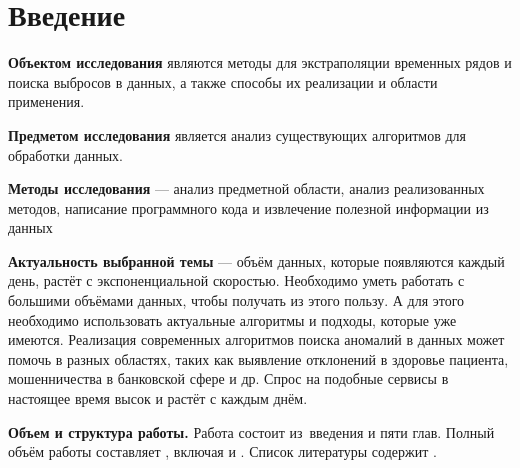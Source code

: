 \chapter*{Введение}                         %

\textbf{Объектом исследования} являются методы для экстраполяции временных рядов и поиска выбросов в данных, а также способы их реализации и области применения.

\textbf{Предметом исследования} является анализ существующих алгоритмов для обработки данных.

\textbf{Методы исследования} — анализ предметной области, анализ реализованных методов, написание программного кода и извлечение полезной информации из данных

\textbf{Актуальность выбранной темы} — объём данных, которые появляются каждый день, растёт с экспоненциальной скоростью. Необходимо уметь работать с большими объёмами данных, чтобы получать из этого пользу. А для этого необходимо использовать актуальные алгоритмы и подходы, которые уже имеются. Реализация современных алгоритмов поиска аномалий в данных может помочь в разных областях, таких как выявление отклонений в здоровье пациента, мошенничества в банковской сфере и др. Спрос на подобные сервисы в настоящее время высок и растёт с каждым днём.

\textbf{Объем и структура работы.} Работа состоит из~введения и пяти глав.
Полный объём работы составляет
, включая
 и
.   Список литературы содержит
.
